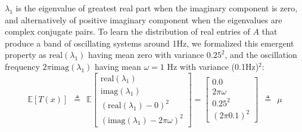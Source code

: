 \documentclass[11pt]{article}
\begin{document}
 $\lambda_1$ is the eigenvalue of greatest real part when the imaginary component is zero, and alternatively of positive imaginary component when the eigenvalues are complex conjugate pairs.  
To learn the distribution of real entries of $A$ that produce a band of oscillating systems around 1Hz, we formalized this emergent property as $\text{real}(\lambda_1)$ having mean zero with variance $0.25^2$, and the oscillation frequency $2 \pi \text{imag}(\lambda_1)$ having mean $\omega = 1$ Hz with variance (0.1Hz)$^2$:
\begin{equation}
 \mathbb{E}\left[T(x) \right] ~~ \triangleq ~~ \mathbb{E} \begin{bmatrix} \text{real}(\lambda_1) \\ \text{imag}(\lambda_1) \\ (\text{real}(\lambda_1)-0)^2  \\ (\text{imag}(\lambda_1)-2 \pi \omega)^2 \end{bmatrix} = \begin{bmatrix} 0.0 \\ 2 \pi \omega \\ 0.25^2 \\ (2 \pi 0.1)^2 \end{bmatrix} ~~ \triangleq ~~ \mu
 \end{equation} 
\end{document}

